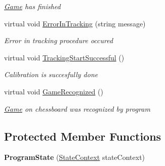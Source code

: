 \begin{DoxyCompactItemize}
\begin{DoxyCompactList}\small\item\em \mbox{\hyperlink{namespace_chess_tracking_1_1_game}{Game}} has finished \end{DoxyCompactList}\item 
virtual void \mbox{\hyperlink{class_chess_tracking_1_1_controlling_elements_1_1_program_state_1_1_program_state_a696ede3bce5b54db8f0d2dd9e7d8eabb}{Error\+In\+Tracking}} (string message)
\begin{DoxyCompactList}\small\item\em Error in tracking procedure occured \end{DoxyCompactList}\item 
virtual void \mbox{\hyperlink{class_chess_tracking_1_1_controlling_elements_1_1_program_state_1_1_program_state_a120f53f07c30eb53b34a7e1de82a4226}{Tracking\+Start\+Successful}} ()
\begin{DoxyCompactList}\small\item\em Calibration is succesfully done \end{DoxyCompactList}\item 
virtual void \mbox{\hyperlink{class_chess_tracking_1_1_controlling_elements_1_1_program_state_1_1_program_state_a5361b01f2091526a01550fa927735889}{Game\+Recognized}} ()
\begin{DoxyCompactList}\small\item\em \mbox{\hyperlink{namespace_chess_tracking_1_1_game}{Game}} on chessboard was recognized by program \end{DoxyCompactList}\end{DoxyCompactItemize}
\subsection*{Protected Member Functions}
\begin{DoxyCompactItemize}
\item 
\mbox{\label{class_chess_tracking_1_1_controlling_elements_1_1_program_state_1_1_program_state_ad8bdd6d95a9a8626f746b6d879aed480}} 
{\bfseries Program\+State} (\mbox{\hyperlink{class_chess_tracking_1_1_controlling_elements_1_1_program_state_1_1_state_context}{State\+Context}} state\+Context)
\end{DoxyCompactItemize}
